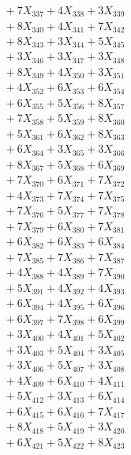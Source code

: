 \documentclass[a4paper,10pt]{article}
\begin{document}
{\begin{align}
&\;  + 7 X_{337} + 4 X_{338} + 3 X_{339} \\[0.5ex]\allowbreak
&\;  + 8 X_{340} + 4 X_{341} + 7 X_{342} \\[0.3ex]
&\;  + 8 X_{343} + 3 X_{344} + 5 X_{345} \\[0.3ex]
&\;  + 3 X_{346} + 3 X_{347} + 3 X_{348} \\[0.3ex]
&\;  + 8 X_{349} + 4 X_{350} + 3 X_{351} \\[0.3ex]
&\;  + 4 X_{352} + 6 X_{353} + 6 X_{354} \\[0.3ex]
&\;  + 6 X_{355} + 5 X_{356} + 8 X_{357} \\[0.3ex]
&\;  + 7 X_{358} + 5 X_{359} + 8 X_{360} \\[0.3ex]
&\;  + 5 X_{361} + 6 X_{362} + 8 X_{363} \\[0.3ex]
&\;  + 6 X_{364} + 3 X_{365} + 3 X_{366} \\[0.3ex]
&\;  + 8 X_{367} + 5 X_{368} + 6 X_{369} \\[0.5ex]\allowbreak
&\;  + 7 X_{370} + 6 X_{371} + 7 X_{372} \\[0.3ex]
&\;  + 4 X_{373} + 7 X_{374} + 7 X_{375} \\[0.3ex]
&\;  + 7 X_{376} + 5 X_{377} + 7 X_{378} \\[0.3ex]
&\;  + 7 X_{379} + 6 X_{380} + 7 X_{381} \\[0.3ex]
&\;  + 6 X_{382} + 6 X_{383} + 6 X_{384} \\[0.3ex]
&\;  + 7 X_{385} + 7 X_{386} + 7 X_{387} \\[0.3ex]
&\;  + 4 X_{388} + 4 X_{389} + 7 X_{390} \\[0.3ex]
&\;  + 5 X_{391} + 4 X_{392} + 4 X_{393} \\[0.3ex]
&\;  + 6 X_{394} + 4 X_{395} + 6 X_{396} \\[0.3ex]
&\;  + 6 X_{397} + 7 X_{398} + 6 X_{399} \\[0.5ex]\allowbreak
&\;  + 3 X_{400} + 4 X_{401} + 5 X_{402} \\[0.3ex]
&\;  + 3 X_{403} + 5 X_{404} + 3 X_{405} \\[0.3ex]
&\;  + 3 X_{406} + 5 X_{407} + 3 X_{408} \\[0.3ex]
&\;  + 4 X_{409} + 6 X_{410} + 4 X_{411} \\[0.3ex]
&\;  + 5 X_{412} + 3 X_{413} + 6 X_{414} \\[0.3ex]
&\;  + 6 X_{415} + 6 X_{416} + 7 X_{417} \\[0.3ex]
&\;  + 8 X_{418} + 5 X_{419} + 3 X_{420} \\[0.3ex]
&\;  + 6 X_{421} + 5 X_{422} + 8 X_{423} \\[0.3ex]

\end{align}}
\end{document}
